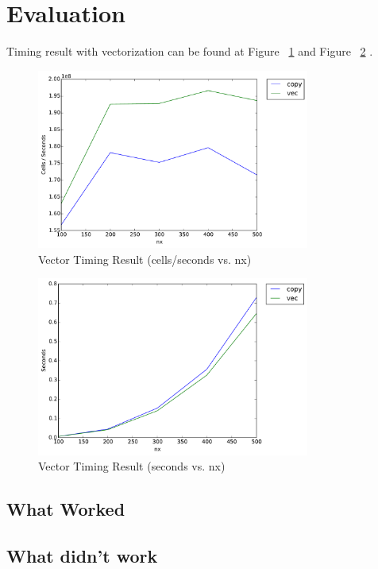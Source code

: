 \section{Evaluation}\label{sec:evaluation}

Timing result with vectorization can be found at Figure ~\ref{fig:vector_timing_result1} and Figure ~\ref{fig:vector_timing_result2} .

\begin{figure}[h]
    \centering
    \includegraphics[width=0.8\textwidth]{figs/vec-timing1.pdf}
    \caption{Vector Timing Result (cells/seconds vs. nx)}
    \label{fig:vector_timing_result1}
\end{figure}

\begin{figure}[h]
    \centering
    \includegraphics[width=0.8\textwidth]{figs/vec-timing2.pdf}
    \caption{Vector Timing Result (seconds vs. nx)}
    \label{fig:vector_timing_result2}
\end{figure}

\subsection{What Worked}

\subsection{What didn’t work}
